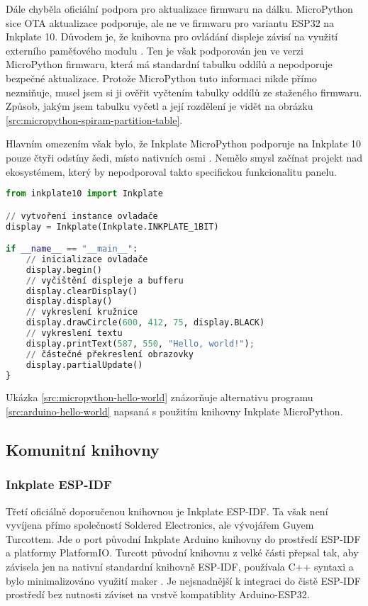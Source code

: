 Dále chyběla oficiální podpora pro aktualizace firmwaru na dálku. MicroPython sice OTA aktualizace podporuje, ale ne ve firmwaru pro variantu ESP32 na Inkplate 10. Důvodem je, že knihovna pro ovládání displeje závisí na využití externího paměťového modulu \cite{SolderedElectronicsInkplatemicropython2024}. Ten je však podporován jen ve verzi MicroPython firmwaru, která má standardní tabulku oddílů a nepodporuje bezpečné aktualizace. Protože MicroPython tuto informaci nikde přímo nezmiňuje, musel jsem si ji ověřit vyčtením tabulky oddílů ze staženého firmwaru. Způsob, jakým jsem tabulku vyčetl a její rozdělení je vidět na obrázku \ref{src:micropython-spiram-partition-table}.

Hlavním omezením však bylo, že Inkplate MicroPython podporuje na Inkplate 10 pouze čtyři odstíny šedi, místo nativních osmi \cite{RenameINKPLATE_2BITINKPLATE_3BIT}. Nemělo smysl začínat projekt nad ekosystémem, který by nepodporoval takto specifickou funkcionalitu panelu.

\begin{lstlisting}[label=src:micropython-hello-world,language=Python,caption={Ilustrační použití knihovny Inkplate MicroPython}]
from inkplate10 import Inkplate

// vytvoření instance ovladače
display = Inkplate(Inkplate.INKPLATE_1BIT)

if __name__ == "__main__":
    // inicializace ovladače
    display.begin()
    // vyčištění displeje a bufferu
    display.clearDisplay()
    display.display()
    // vykreslení kružnice
    display.drawCircle(600, 412, 75, display.BLACK)
    // vykreslení textu
    display.printText(587, 550, "Hello, world!");
    // částečné překreslení obrazovky
    display.partialUpdate()
}
\end{lstlisting}

Ukázka \ref{src:micropython-hello-world} znázorňuje alternativu programu \ref{src:arduino-hello-world} napsaná s použitím knihovny Inkplate MicroPython.

\subsection{Komunitní knihovny}
\subsubsection{Inkplate ESP-IDF}

Třetí oficiálně doporučenou knihovnou je Inkplate ESP-IDF. Ta však není vyvíjena přímo společností Soldered Electronics, ale vývojářem Guyem Turcottem. Jde o port původní Inkplate Arduino knihovny do prostředí ESP-IDF a platformy PlatformIO. Turcott původní knihovnu z velké části přepsal tak, aby závisela jen na nativní standardní knihovně ESP-IDF, používala C++ syntaxi a bylo minimalizováno využití maker \cite{ESPIDFInkPlateREADMEMd}. Je nejsnadnější k integraci do čistě ESP-IDF prostředí bez nutnosti záviset na vrstvě kompatiblity Arduino-ESP32.

